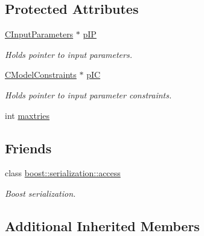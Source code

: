 \subsection*{Protected Attributes}
\begin{DoxyCompactItemize}
\item 
\hyperlink{class_go_s_u_m_1_1_c_input_parameters}{C\-Input\-Parameters} $\ast$ \hyperlink{class_go_s_u_m_1_1_c_model_hypercube_a7382643c37cf27c4b1e881bdf08b7ff4}{p\-I\-P}
\begin{DoxyCompactList}\small\item\em Holds pointer to input parameters. \end{DoxyCompactList}\item 
\hyperlink{class_go_s_u_m_1_1_c_model_constraints}{C\-Model\-Constraints} $\ast$ \hyperlink{class_go_s_u_m_1_1_c_model_hypercube_afefc6601f2bb4b95c7bd56250fcef2c4}{p\-I\-C}
\begin{DoxyCompactList}\small\item\em Holds pointer to input parameter constraints. \end{DoxyCompactList}\item 
int \hyperlink{class_go_s_u_m_1_1_c_model_hypercube_a2b0d3bcbf328d89f7bcb3706795dbbc4}{maxtries}
\end{DoxyCompactItemize}
\subsection*{Friends}
\begin{DoxyCompactItemize}
\item 
class \hyperlink{class_go_s_u_m_1_1_c_model_hypercube_ac98d07dd8f7b70e16ccb9a01abf56b9c}{boost\-::serialization\-::access}
\begin{DoxyCompactList}\small\item\em Boost serialization. \end{DoxyCompactList}\end{DoxyCompactItemize}
\subsection*{Additional Inherited Members}


